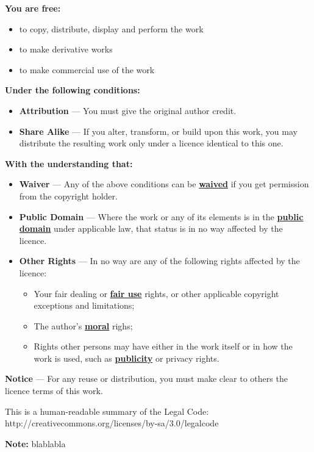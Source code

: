 \begin{center}
\begin{minipage}{0.8 \textwidth}
\vspace{2cm}%
\textbf{You are free:}
\begin{itemize}
\item to copy, distribute, display and perform the work
\item to make derivative works
\item to make commercial use of the work
\end{itemize}
\vspace{1cm}

\textbf{Under the following conditions:}
\begin{itemize}
\item\textbf{Attribution} --- You must give the original author credit.
\item\textbf{Share Alike} --- If you alter, transform, or build upon this work, you may distribute the resulting work only under a licence identical to this one.
\end{itemize}

\vspace{1cm}

\textbf{With the understanding that:}
\begin{itemize}
\item\textbf{Waiver} --- Any of the above conditions can be \textbf{\underline{waived}} if you get permission from the copyright holder.

\item\textbf{Public Domain} --- Where the work or any of its elements is in the \textbf{\underline{public domain}} under applicable law, that status is in no way affected by the licence.

\item\textbf{Other Rights} --- In no way are any of the following rights affected by the licence:
\begin{itemize}
\item Your fair dealing or \textbf{\underline{fair use}} rights, or other applicable copyright exceptions and limitations;
\item The author's \textbf{\underline{moral}} righs;
\item Rights other persons may have either in the work itself or in how the work is used, such as \textbf{\underline{publicity}} or privacy rights.
\end{itemize}

\end{itemize}

\vspace{0.5cm}
\begin{center}
\textbf{Notice} --- For any reuse or distribution, you must make clear to others the licence terms of this work.
\end{center}

\vspace{0.5cm}
\begin{center}
This is a human-readable summary of the Legal Code: http://creativecommons.org/licenses/by-sa/3.0/legalcode
\end{center}
\end{minipage}
\end{center}
\vspace{0.2cm}
\textbf{Note: }blablabla

\pagebreak